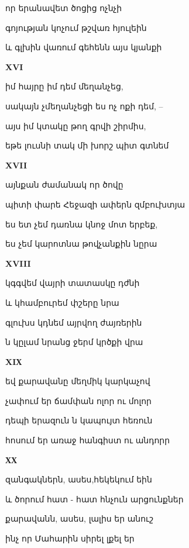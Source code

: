 որ երանավետ  ծոցից ոչնչի


գոյության կոչում թշվառ հյուլեին 

և  գլխին վառում գեհենն այս կյանքի



 \centerline {\bf   XVI} 

                  

 իմ հայրը իմ դեմ մեղանչեց,


  սակայն չմեղանչեցի ես ոչ ոքի  դեմ, -- 


  այս իմ կտակը թող գրվի շիրմիս,


  եթե լուսնի տակ մի խորշ պիտ գտնեմ



\centerline{\bf XVII}


այնքան  ժամանակ որ ծովը


պիտի փարե Հեջազի ափերն զմբուխտյա 



ես ետ չեմ դառնա կնոջ մոտ երբեք, 



ես չեմ կարոտնա թովչանքին նըրա 

\centerline{\bf XVIII}

կգգվեմ վայրի տատասկը դժնի



 և կհամբուրեմ փշերը նրա


գլուխս կդնեմ այրվող ժայռերին 


ն կըլամ նրանց ջերմ կրծքի վրա  



\centerline{\bf XIХ}

 եվ քարավանը մեղմիկ կարկաչով 




չափում եր ճամփան ոլոր ու մոլոր



դեպի երազուն ն կապույտ հեռուն




հոսում եր առաջ հանգիստ ու անդորր


\centerline{\bf ХХ}




զանգակներն, ասես,հեկեկում  եին



և ծորում հատ - հատ հնչուն արցունքներ


քարավանն, ասես, լալիս եր անուշ


ինչ որ     Մահարին սիրել լքել եր





 

